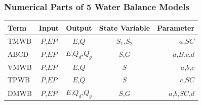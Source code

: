 \documentclass{beamer}
\begin{document}
\begin{frame}
\frametitle{Numerical Parts of 5 Water Balance Models}
\begin{table}[H]
\begin{center}
\begin{tabular}{lcccr}
\toprule
Term  & Input & Output & State Variable & Parameter  \\
\midrule
TMWB   & $P$,$EP$& $E$,$Q$        & $S_1$,$S_2$&$a$,$SC$        \\
ABCD   & $P$,$EP$& $E$,$Q_d$,$Q_g$& $S$,$G$    &$a$,$B$,$c$,$d$ \\
VMWB   & $P$,$EP$& $E$,$Q$        & $S$        &$a$,$b$,$c$     \\
TPWB   & $P$,$EP$& $E$,$Q$        & $S$        &$c$,$SC$        \\
DMWB   & $P$,$EP$& $E$,$Q_d$,$Q_g$&$S$,$G$     &$a$,$b$,$SC$,$d$\\
\bottomrule
\end{tabular}
\end{center}
\end{table}
\end{frame}
\end{document}

